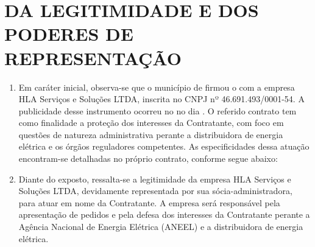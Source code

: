 \section{DA LEGITIMIDADE E DOS PODERES DE REPRESENTAÇÃO}

\begin{enumerate}
\item
  Em caráter inicial, observa-se que o município de \nomeMunicipio{} firmou o \numeroContrato{} com a empresa HLA Serviços e Soluções LTDA, inscrita no CNPJ nº 46.691.493/0001-54. A publicidade desse instrumento ocorreu no \publicacao{} no dia \dataPublicacao{}. O referido contrato tem como finalidade a proteção dos interesses da Contratante, com foco em questões de natureza administrativa perante a distribuidora de energia elétrica e os órgãos reguladores competentes. As especificidades dessa atuação encontram-se detalhadas no próprio contrato, conforme segue abaixo:
\Citacao{\clausula{}}
\item
  Diante do exposto, ressalta-se a legitimidade da empresa HLA Serviços e Soluções LTDA, devidamente representada por sua sócia-administradora, para atuar em nome da Contratante. A empresa será responsável pela apresentação de pedidos e pela defesa dos interesses da Contratante perante a Agência Nacional de Energia Elétrica (ANEEL) e a distribuidora de energia elétrica.
\end{enumerate}
